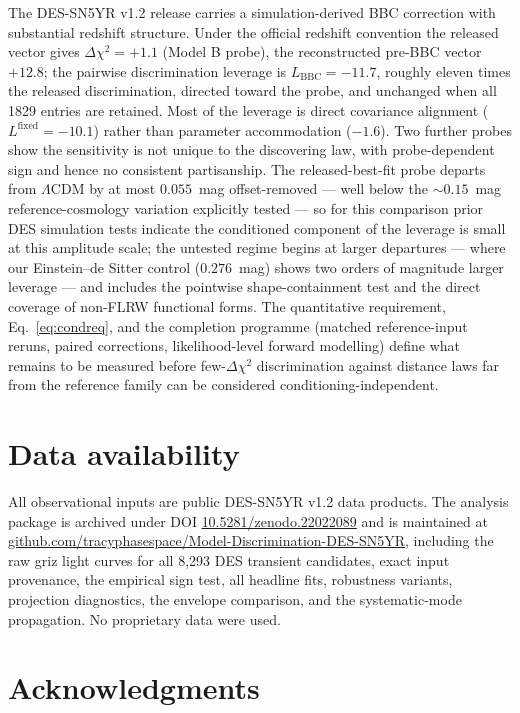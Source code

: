 \documentclass[11pt]{article}
\newcommand{\paperdoi}{10.5281/zenodo.22022089}
\begin{document}
The DES-SN5YR v1.2 release carries a simulation-derived BBC correction
with substantial redshift structure. Under the official redshift
convention the released vector gives $\Delta\chi^2 = +1.1$ (Model B
probe), the reconstructed pre-BBC vector $+12.8$; the pairwise
discrimination leverage is $L_{\mathrm{BBC}} = -11.7$, roughly eleven
times the released discrimination, directed toward the probe, and
unchanged when all 1829 entries are retained. Most of the leverage is
direct covariance alignment ($L^{\mathrm{fixed}} = -10.1$) rather than
parameter accommodation ($-1.6$). Two further probes show the
sensitivity is not unique to the discovering law, with probe-dependent
sign and hence no consistent partisanship. The released-best-fit probe
departs from $\Lambda$CDM by at most $0.055$~mag offset-removed --- well
below the $\sim 0.15$~mag reference-cosmology variation
\citet{Camilleri2024} explicitly tested --- so for this comparison prior
DES simulation tests indicate the conditioned component of the leverage
is small at this amplitude scale; the untested regime begins at larger
departures --- where our Einstein--de Sitter control ($0.276$~mag) shows
two orders of magnitude larger leverage --- and includes the pointwise
shape-containment test and the direct coverage of non-FLRW functional
forms. The
quantitative requirement, Eq.~\eqref{eq:condreq}, and the completion
programme (matched reference-input reruns, paired corrections,
likelihood-level forward modelling) define what remains to be measured
before few-$\Delta\chi^2$ discrimination against distance laws far from
the reference family can be considered conditioning-independent.

\section*{Data availability}

All observational inputs are public DES-SN5YR v1.2 data products. The
analysis package is archived under DOI
\href{https://doi.org/10.5281/zenodo.22022089}{\paperdoi} and is maintained
at
\href{https://github.com/tracyphasespace/Model-Discrimination-DES-SN5YR}{github.com/tracyphasespace/Model-Discrimination-DES-SN5YR},
including the raw griz light curves for all 8{,}293 DES transient
candidates, exact input provenance, the empirical sign test, all headline
fits, robustness variants, projection diagnostics, the envelope
comparison, and the systematic-mode propagation. No proprietary data were
used.

\section*{Acknowledgments}
\end{document}
